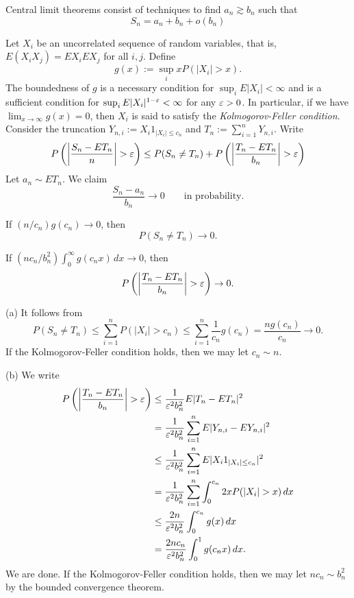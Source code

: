 \documentclass{../../large}
\begin{document}
Central limit theorems consist of techniques to find $a_n\gtrsim b_n$ such that
\[S_n=a_n+b_n+o(b_n)\]

\begin{prb}
Let $X_i$ be an uncorrelated sequence of random variables, that is, $E(X_iX_j)=EX_iEX_j$ for all $i,j$.
Define
\[g(x):=\sup_ixP(|X_i|>x).\]
The boundedness of $g$ is a necessary condition for $\sup_iE|X_i|<\infty$ and is a sufficient condition for $\sup_iE|X_i|^{1-\varepsilon}<\infty$ for any $\varepsilon>0$.
In particular, if we have $\lim_{x\to\infty}g(x)=0$, then $X_i$ is said to satisfy the \emph{Kolmogorov-Feller condition}.
Consider the truncation $Y_{n,i}:=X_i1_{|X_i|\le c_n}$ and $T_n:=\sum_{i=1}^nY_{n,i}$.
Write
\[P\left(\left|\frac{S_n-ET_n}n\right|>\e\right)\le P(S_n\ne T_n)+P\left(\left|\frac{T_n-ET_n}{b_n}\right|>\e\right)\]
Let $a_n\sim ET_n$.
We claim
\[\frac{S_n-a_n}{b_n}\to0\qquad\text{in probability}.\]
\begin{parts}
\item If $(n/c_n)g(c_n)\to0$, then
\[P(S_n\ne T_n)\to0.\]
\item If $(nc_n/b_n^2)\int_0^\infty g(c_nx)\,dx\to0$, then
\[P\left(\left|\frac{T_n-ET_n}{b_n}\right|>\e\right)\to0.\]
\end{parts}
\end{prb}
\begin{pf}
(a)
It follows from
\[P(S_n\ne T_n)\le\sum_{i=1}^nP(|X_i|>c_n)\le\sum_{i=1}^n\frac1{c_n}g(c_n)=\frac{ng(c_n)}{c_n}\to0.\]
If the Kolmogorov-Feller condition holds, then we may let $c_n\sim n$.

(b)
We write
\begin{align*}
P\left(\left|\frac{T_n-ET_n}{b_n}\right|>\e\right)
&\le\frac1{\e^2b_n^2}E|T_n-ET_n|^2\\
&=\frac1{\e^2b_n^2}\sum_{i=1}^nE|Y_{n,i}-EY_{n,i}|^2\\
&\le\frac1{\e^2b_n^2}\sum_{i=1}^nE|X_i1_{|X_i|\le c_n}|^2\\
&=\frac1{\e^2b_n^2}\sum_{i=1}^n\int_0^{c_n}2xP(|X_i|>x)\,dx\\
&\le\frac{2n}{\e^2b_n^2}\int_0^{c_n}g(x)\,dx\\
&=\frac{2nc_n}{\e^2b_n^2}\int_0^1g(c_nx)\,dx.
\end{align*}
We are done.
If the Kolmogorov-Feller condition holds, then we may let $nc_n\sim b_n^2$ by the bounded convergence theorem.

\end{pf}


\begin{prb}
\end{prb}
\end{document}
